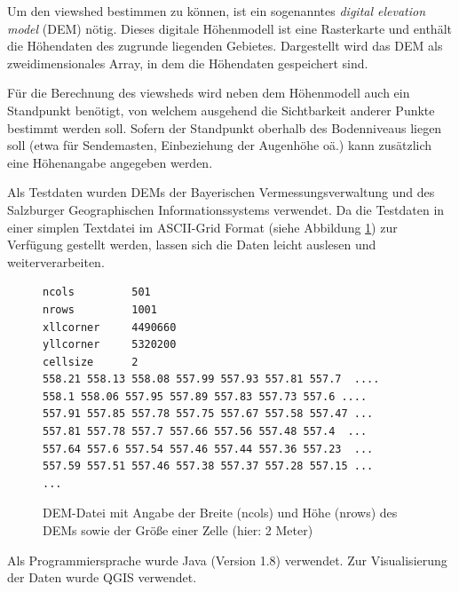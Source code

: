 Um den viewshed bestimmen zu können, ist ein sogenanntes \textit{digital elevation model} (DEM) nötig. 
Dieses digitale Höhenmodell ist eine Rasterkarte und enthält die Höhendaten des zugrunde liegenden Gebietes. 
Dargestellt wird das DEM als zweidimensionales Array, in dem die Höhendaten gespeichert sind. 

\noident Für die Berechnung des viewsheds wird neben dem Höhenmodell auch ein Standpunkt benötigt, von welchem ausgehend die Sichtbarkeit anderer Punkte bestimmt werden soll. 
Sofern der Standpunkt oberhalb des Bodenniveaus liegen soll (etwa für Sendemasten, Einbeziehung der Augenhöhe oä.) kann zusätzlich eine Höhenangabe angegeben werden. 



\noindent Als Testdaten wurden DEMs der Bayerischen Vermessungsverwaltung \cite{berchtesgaden} und des Salzburger Geographischen Informationssystems 
\cite{salzburg} verwendet. Da die Testdaten in einer simplen Textdatei im ASCII-Grid Format (siehe Abbildung \ref{testfile}) zur Verfügung gestellt werden, lassen sich die Daten leicht auslesen und weiterverarbeiten.

\begin{figure}[!ht]
 \centering
 \begin{BVerbatim}
ncols         501
nrows         1001
xllcorner     4490660
yllcorner     5320200
cellsize      2
558.21 558.13 558.08 557.99 557.93 557.81 557.7  ....
558.1 558.06 557.95 557.89 557.83 557.73 557.6 ....
557.91 557.85 557.78 557.75 557.67 557.58 557.47 ...
557.81 557.78 557.7 557.66 557.56 557.48 557.4  ...
557.64 557.6 557.54 557.46 557.44 557.36 557.23  ...
557.59 557.51 557.46 557.38 557.37 557.28 557.15 ...
...
\end{BVerbatim}
\caption{DEM-Datei mit Angabe der Breite (ncols) und Höhe (nrows) des DEMs sowie der Größe einer Zelle (hier: 2 Meter)}
\label{testfile}
\end{figure}

\noindent Als Programmiersprache wurde Java (Version 1.8) verwendet. Zur Visualisierung der Daten wurde QGIS verwendet. 

